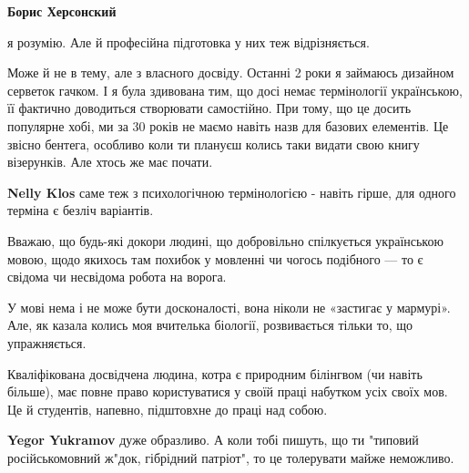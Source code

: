 \begin{itemize}
\begin{itemize}
\textbf{Борис Херсонский} 

я розумію. Але й професійна підготовка у них теж відрізняється.

Може й не в тему, але з власного досвіду. Останні 2 роки я займаюсь дизайном
серветок гачком. І я була здивована тим, що досі немає термінології
українською, її фактично доводиться створювати самостійно. При тому, що це
досить популярне хобі, ми за 30 років не маємо навіть назв для базових
елементів. Це звісно бентега, особливо коли ти плануєш колись таки видати свою
книгу візерунків. Але хтось же має почати.


 
\textbf{Nelly Klos} саме теж з психологічною термінологією - навіть гірше, для одного терміна є безліч варіантів.
\end{itemize}

 

Вважаю, що будь-які докори людині, що добровільно спілкується українською
мовою, щодо якихось там похибок у мовленні чи чогось подібного — то є свідома
чи несвідома робота на ворога.

У мові нема і не може бути досконалості, вона ніколи не «застигає у мармурі».
Але, як казала колись моя вчителька біології, розвивається тільки то, що
упражняється. \Smiley[1.0][yellow]

Кваліфікована досвідчена людина, котра є природним білінгвом (чи навіть
більше), має повне право користуватися у своїй праці набутком усіх своїх мов.
Це й студентів, напевно, підштовхне до праці над собою.

\begin{itemize}
 
\textbf{Yegor Yukramov} дуже образливо. А коли тобі пишуть, що ти "типовий російськомовний ж"док, гібрідний патріот", то це толерувати майже неможливо.


\end{itemize}
\end{itemize}
